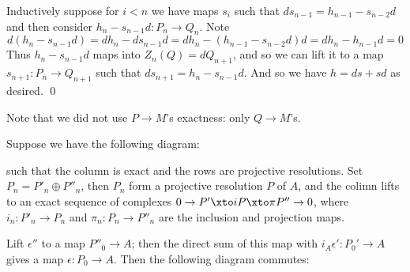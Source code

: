     Inductively suppose for $i<n$ we have maps $s_i$ such that $ds_{n-1}=h_{n-1}-s_{n-2}d$ and then consider $h_n-s_{n-1}d\colon P_n\to Q_n$.
    Note
    $$ d(h_n-s_{n-1}d) = dh_n - ds_{n-1}d = dh_n - (h_{n-1} - s_{n-2}d)d = dh_n - h_{n-1}d = 0 $$
    Thus $h_n-s_{n-1}d$ maps into $Z_n(Q)=dQ_{n+1}$, and so we can lift it to a map $s_{n+1}\colon P_n\to Q_{n+1}$ such that $ds_{n+1}=h_n-s_{n-1}d$.
    And so we have $h=ds+sd$ as desired.
    \qed

\eproof

Note that we did not use $P\to M$'s exactness: only $Q\to M$'s.

\blemm[title=Horeshoe lemma]

    Suppose we have the following diagram:

    \centerline{}

    such that the column is exact and the rows are projective resolutions.
    Set $P_n=P'_n\oplus P''_n$, then $P_n$ form a projective resolution $P$ of $A$, and the colimn lifts to an exact sequence of complexes $0\to P'\xto iP\xto\pi P''\to0$,
    where $i_n\colon P'_n\to P_n$ and $\pi_n\colon P_n\to P''_n$ are the inclusion and projection maps.

\elemm

\bproof

    Lift $\epsilon''$ to a map $P''_0\to A$; then the direct sum of this map with $i_A\epsilon'\colon P_0'\to A$ gives a map $\epsilon\colon P_0\to A$.
    Then the following diagram commutes:

